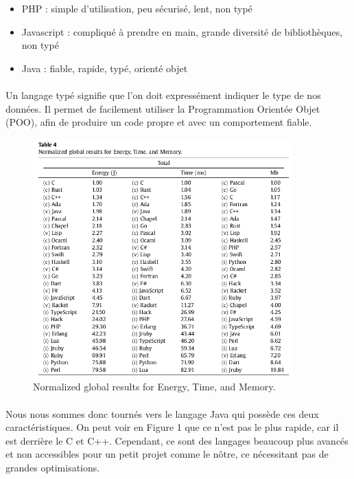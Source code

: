 \documentclass[a4paper, 12pt]{article}
\begin{document}
\begin{itemize}
	\item PHP : simple d’utilisation, peu sécurisé, lent, non typé
	\item Javascript : compliqué à prendre en main, grande diversité de bibliothèques, non typé
	\item Java : fiable, rapide, typé, orienté objet
\end{itemize}

\paragraph{}Un langage typé signifie que l’on doit expressément indiquer le type de nos données. Il permet de facilement utiliser la Programmation Orientée Objet (POO), afin de produire un code propre et avec un comportement fiable. 

\begin{figure}[H]
	\begin{center}
		\includegraphics[width=10cm]{fig/tableLang}
		\caption{Normalized global results for Energy, Time, and Memory.\cite{pereira_ranking_2021}}
	\end{center}
\end{figure}

\paragraph{}Nous nous sommes donc tournés vers le langage Java qui possède ces deux caractéristiques. On peut voir en Figure 1 que ce n’est pas le plus rapide, car il est derrière le C et C++. Cependant, ce sont des langages beaucoup plus avancés et non accessibles pour un petit projet comme le nôtre, ce nécessitant pas de grandes optimisations.
\end{document}
